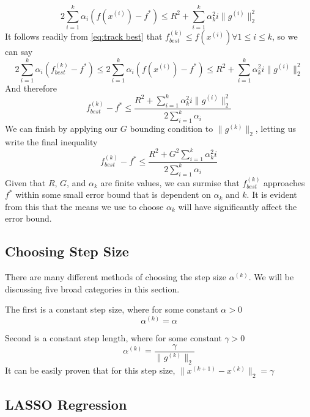 \documentclass[journal,onecolumn]{IEEEtran}
\begin{document}
\begin{equation}
    2\sum^k_{i=1}\alpha_i (f(x^{(i)})-f^*) \leq R^2  + \sum^k_{i=1}\alpha^2_ki\|g^{(i)}\|^2_2
\end{equation}
It follows readily from \eqref{eq:track best} that \(f^{(k)}_{best} \leq f(x^{(i)}) \forall 1 \leq i \leq k\), so we can say
\begin{equation}
    2\sum^k_{i=1}\alpha_i (f^{(k)}_{best}-f^*) \leq 2\sum^k_{i=1}\alpha_i (f(x^{(i)})-f^*) \leq R^2  + \sum^k_{i=1}\alpha^2_ki\|g^{(i)}\|^2_2
\end{equation}
And therefore
\begin{equation}
    f^{(k)}_{best}-f^* \leq \frac{R^2  + \sum^k_{i=1}\alpha^2_ki\|g^{(i)}\|^2_2}{2\sum^k_{i=1}\alpha_i}
\end{equation}
We can finish by applying our \(G\) bounding condition to \(\|g^{(k)}\|_2\), letting us write the final inequality
\begin{equation}
    f^{(k)}_{best}-f^* \leq \frac{R^2  + G^2 \sum^k_{i=1}\alpha^2_ki}{2\sum^k_{i=1}\alpha_i}
\end{equation}
Given that \(R\), \(G\), and \(\alpha_k\) are finite values, we can surmise that \(f^{(k)}_{best}\) approaches \(f^*\) within some small error bound that is dependent on \(\alpha_k\) and \(k\). It is evident from this that the means we use to choose \(\alpha_k\) will have significantly affect the error bound.

\subsection{Choosing Step Size}\label{sec:choosing step size}
There are many different methods of choosing the step size \(\alpha^{(k)}\). We will be discussing five broad categories in this section.

The first is a constant step size, where for some constant \(\alpha > 0\)
\begin{equation}\label{eq:constant step size}
\alpha^{(k)} = \alpha
\end{equation}

Second is a constant step length, where for some constant \(\gamma > 0\)
\begin{equation}\label{eq:constant step length}
\alpha^{(k)} = \frac{\gamma}{\|g^{(k)}\|_2}
\end{equation}
It can be easily proven that for this step size, \(\|x^{(k+1)}-x^{(k)}\|_2 = \gamma\)

\subsection{LASSO Regression}\label{sec:math lasso}
\end{document}

